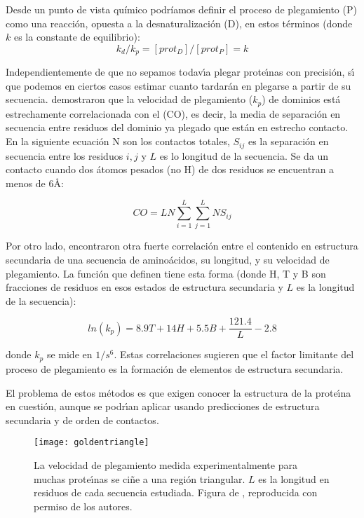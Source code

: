 Desde un punto de vista qu\'{i}mico podr\'{i}amos definir el proceso de plegamiento (P) como una reacci\'{o}n, opuesta a la 
desnaturalizaci\'{o}n (D), en estos t\'{e}rminos (donde $k$ es la constante de equilibrio):
\begin{equation}
k_{d}/k_{p}=[prot_{D}]/[prot_{P}] = k
\end{equation}

Independientemente de que no sepamos todav\'\i{}a plegar 
prote\'\i{}nas con precisi\'{o}n, s\'\i{} que podemos 
en ciertos casos estimar cuanto tardar\'{a}n en plegarse a partir de su secuencia. \citet{Plaxco1998}
demostraron que la velocidad de plegamiento ($k_{p}$) de dominios est\'{a} estrechamente correlacionada con
el  (CO), es decir, la media de separaci\'{o}n en secuencia entre residuos del dominio
ya plegado que est\'{a}n en estrecho contacto. En la siguiente ecuaci\'{o}n N son los contactos totales, 
$S_{ij}$ es la separaci\'{o}n en secuencia entre los residuos $i,j$ y $L$ es lo longitud de la secuencia.
Se da un contacto cuando dos \'{a}tomos pesados (no H) de dos residuos se encuentran a menos de 6\AA:

\begin{equation}
CO = LN \sum_{i=1}^{L} \sum_{j=1}^{L} N S_{ij}
\end{equation}

Por otro lado, \citet{SSfoldingrate2003} encontraron otra fuerte correlaci\'{o}n entre el contenido
en estructura secundaria de una secuencia de amino\'{a}cidos, su longitud, y su velocidad de plegamiento.
La funci\'{o}n que definen tiene esta forma (donde H, T y B son fracciones de residuos en esos estados de
estructura secundaria y $L$ es la longitud de la secuencia):

\begin{equation}
ln(k_{p}) = 8{.}9T + 14H + 5{.}5B + \frac{121{.}4}{L} - 2{.}8
\end{equation}

donde $k_{p}$ se mide en $1/s^{6}$. Estas correlaciones sugieren que el factor limitante del proceso 
de plegamiento es la formaci\'{o}n de elementos de estructura secundaria.

El problema de estos m\'{e}todos es que exigen conocer la estructura de la prote\'\i{}na en cuesti\'{o}n, aunque
se podr\'\i{}an aplicar usando predicciones de estructura secundaria y de orden de contactos. 

\begin{figure}
\begin{center} 
\texttt{[image: goldentriangle]}
\caption%
{
La velocidad de plegamiento medida experimentalmente para muchas prote\'\i{}nas se ci\~{n}e a una regi\'{o}n triangular.
$L$ es la longitud en residuos de cada secuencia estudiada. Figura de \citet{Garbuzynskiy2013}, reproducida con permiso de los autores.
}
\label{fig:goldentriangle}
\end{center}
\end{figure}


